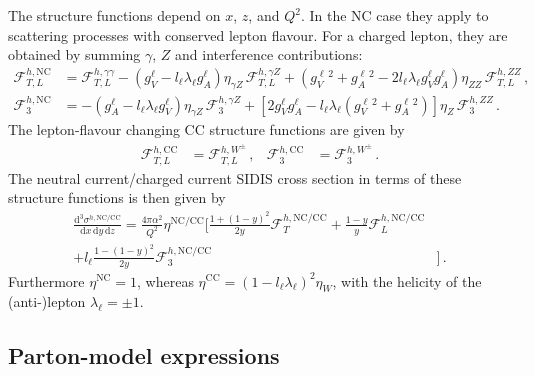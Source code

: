 \documentclass[11pt,a4paper]{article}
\newcommand{\Fcal}{\mathcal{F}}
\newcommand{\dd}{\mathrm{d}}
\newcommand{\NC}{\mathrm{NC}}
\newcommand{\CC}{\mathrm{CC}}
\begin{document}
The structure functions depend  on $x$, $z$, and $Q^2$.
In the NC case they apply to scattering processes with conserved lepton flavour.
For a charged lepton, they are obtained by summing $\gamma$, $Z$ and interference contributions:
\begin{align} \label{eq:SFNC}
\mathcal{F}_{T,L}^{h,\NC}&= \mathcal{F}_{T,L}^{h,\gamma\gamma}-\left(g^{\ell}_V - l_{\ell} \lambda_{\ell} g^{\ell}_A\right)\eta_{\gamma Z}\,\mathcal{F}_{T,L}^{h,\gamma Z}+\left(g^{\ell \, 2}_V+g^{\ell \, 2}_A - 2 l_{\ell} \lambda_{\ell} g^{\ell}_Vg^{\ell}_A\right)\eta_{ZZ}\,\mathcal{F}_{T,L}^{h,ZZ} \, , \nonumber \\
\mathcal{F}_{3}^{h,\NC}&= -\left(g^{\ell}_A - l_{\ell} \lambda_{\ell} g^{\ell}_V\right)\eta_{\gamma Z}\,\mathcal{F}_{3}^{h,\gamma Z} + \left[2 g^{\ell}_V g^{\ell}_A - l_{\ell} \lambda_{\ell} \left(g^{\ell \, 2}_V+g^{\ell \, 2}_A \right)\right]\eta_Z\, \mathcal{F}_{3}^{h,ZZ}\,  .
\end{align}
The lepton-flavour changing $\CC$ structure functions are given by
\begin{align}
\mathcal{F}_{T,L}^{h,\CC}&= \mathcal{F}_{T,L}^{h,W^{\pm}} \, , &
\mathcal{F}_{3}^{h,\CC}&= \mathcal{F}_{3}^{h,W^{\pm}} \,  .
\end{align}
The neutral current/charged current SIDIS cross section in terms of these structure functions is then given by
\begin{align}\label{eq:xsNCCC}
\frac{\dd^3 \sigma^{h,\NC / \CC}}{\dd x\,\dd y\,\dd z} = \frac{4\pi \alpha^2}{Q^2} \eta^{\NC/\CC} \Bigg[  \frac{1+(1-y)^2}{2y}\Fcal_T^{h,\NC / \CC}+\frac{1-y}{y}\Fcal_L^{h,\NC / \CC} & \nonumber \\
+ l_{\ell} \frac{1-(1-y)^2}{2y}\Fcal_3^{h,\NC / \CC}&  \Bigg] \,  .
\end{align}
Furthermore $\eta^{\NC}=1$, whereas $\eta^{\CC}=(1 - l_{\ell}\lambda_{\ell})^2\eta_W$, with the helicity of the (anti-)lepton $\lambda_{\ell}=\pm 1$.


\subsection{Parton-model expressions}
\end{document}
